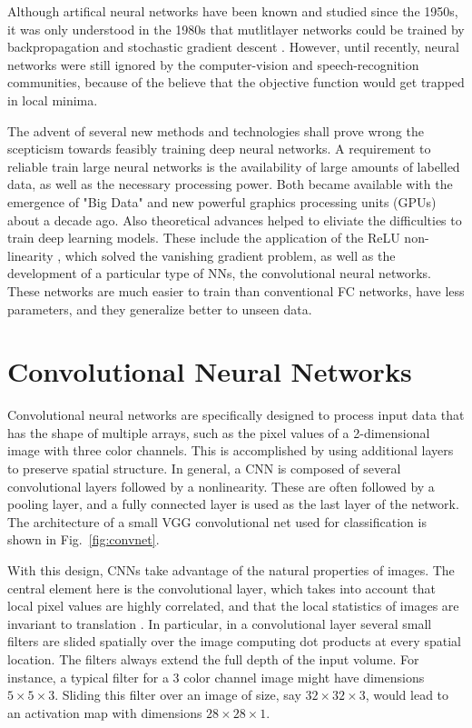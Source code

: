 Although artifical neural networks have been known and studied since the 1950s, it was only understood in the 1980s that mutlitlayer networks could be trained by backpropagation and stochastic gradient descent \parencite{lecun1989}. However, until recently, neural networks were still ignored by the computer-vision and speech-recognition communities, because of the believe that the objective function would get trapped in local minima. 

The advent of several new methods and technologies shall prove wrong the scepticism towards feasibly training deep neural networks. A requirement to reliable train large neural networks is the availability of large amounts of labelled data, as well as the necessary processing power. Both became available with the emergence of "Big Data" and new powerful graphics processing units (GPUs) about a decade ago.
Also theoretical advances helped to eliviate the difficulties to train deep learning models. These include the application of the ReLU non-linearity \parencite{glorot2011}, which solved the vanishing gradient problem, as well as the development of a particular type of NNs, the convolutional neural networks. These networks are much easier to train than conventional FC networks, have less parameters, and they generalize better to unseen data. 

\section{Convolutional Neural Networks}
Convolutional neural networks \parencite{vaillant1993, lecun1998} are specifically designed to process input data that has the shape of multiple arrays, such as the pixel values of a 2-dimensional image with three color channels. This is accomplished by using additional layers to preserve spatial structure. In general, a CNN is composed of several convolutional layers followed by a nonlinearity. These are often followed by a pooling layer, and a fully connected layer is used as the last layer of the network. The architecture of a small VGG convolutional net \parencite{simonyan2014}  used for classification is shown in Fig.~\ref{fig:convnet}.

With this design, CNNs take advantage of the natural properties of images. The central element here is the convolutional layer, which takes into account that local pixel values are highly correlated, and that the local statistics of images are invariant to translation \parencite{lawrence1997}. In particular, in a convolutional layer several small filters are slided spatially over the image computing dot products at every spatial location. The filters always extend the full depth of the input volume. For instance, a typical filter for a 3 color channel image might have dimensions $5 \times 5 \times 3$. Sliding this filter over an image of size, say  $32\times32\times3$, would lead to an activation map with dimensions $28\times28\times1$. 

